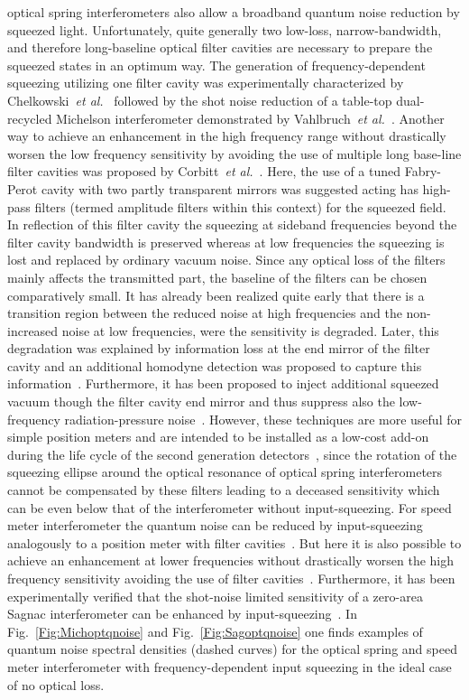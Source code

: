 optical spring interferometers also allow a broadband quantum
noise reduction by squeezed light. Unfortunately, quite generally
two low-loss, narrow-bandwidth, and therefore long-baseline
optical filter cavities are necessary to prepare the squeezed
states in an optimum way.  The generation of frequency-dependent
squeezing utilizing one filter cavity was experimentally
characterized by Chelkowski~\textit{et al.}~\cite{Chelkowski2005}
followed by the shot noise reduction of a table-top dual-recycled
Michelson interferometer demonstrated by Vahlbruch~\textit{et
al.}~\cite{Vahlbruch2005}. Another way to achieve an enhancement
in the high frequency range without drastically worsen the low
frequency sensitivity by avoiding the use of multiple long
base-line filter cavities was proposed by Corbitt~\textit{et
al.}~\cite{Corbitt2004}. Here, the use of a tuned Fabry-Perot
cavity with two partly transparent mirrors was suggested acting
has high-pass filters (termed amplitude filters within this
context) for the squeezed field. In reflection of this filter
cavity the squeezing at sideband frequencies beyond the filter
cavity bandwidth is preserved whereas at low frequencies the
squeezing is lost and replaced by ordinary vacuum noise. Since any
optical loss of the filters mainly affects the transmitted part,
the baseline of the filters can be chosen comparatively small. It
has already been realized quite early that there is a transition
region between the reduced noise at high frequencies and the
non-increased noise at low frequencies, were the sensitivity is
degraded. Later, this degradation was explained by information
loss at the end mirror of the filter cavity and an additional
homodyne detection was proposed to capture this
information~\cite{Khalili2008}. Furthermore, it has been proposed
to inject additional squeezed vacuum though the filter cavity end
mirror and thus suppress also the low-frequency
radiation-pressure noise~\cite{Khalili2009}. However, these
techniques are more useful for simple position meters and are
intended to be installed as a low-cost add-on during the life
cycle of the second generation detectors~\cite{Khalili}, since the
rotation of the squeezing ellipse around the optical resonance of
optical spring interferometers cannot be compensated by these
filters leading to a deceased sensitivity which can be even below
that of the interferometer without input-squeezing. For speed meter
interferometer the quantum noise can be reduced by input-squeezing
analogously to a position meter with filter
cavities~\cite{Purdue2002a}. But here it is also possible to
achieve an enhancement at lower frequencies without drastically
worsen the high frequency sensitivity avoiding the use of filter
cavities~\cite{Eberle2010}. Furthermore, it has been
experimentally verified that the shot-noise limited sensitivity of
a zero-area Sagnac interferometer can be enhanced by
input-squeezing~\cite{Eberle2010}. In Fig.~\ref{Fig:Michoptqnoise}
and Fig.~\ref{Fig:Sagoptqnoise} one finds examples of quantum
noise spectral densities (dashed curves) for the optical spring and
speed meter interferometer with frequency-dependent input
squeezing in the ideal case of no optical loss.

